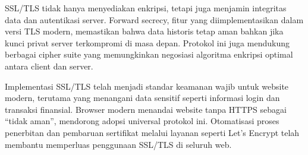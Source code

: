 \documentclass[a4paper,12pt]{report}
\begin{document}
SSL/TLS tidak hanya menyediakan enkripsi, tetapi juga menjamin integritas data dan autentikasi server. Forward secrecy, fitur yang diimplementasikan dalam versi TLS modern, memastikan bahwa data historis tetap aman bahkan jika kunci privat server terkompromi di masa depan. Protokol ini juga mendukung berbagai cipher suite yang memungkinkan negosiasi algoritma enkripsi optimal antara client dan server.

Implementasi SSL/TLS telah menjadi standar keamanan wajib untuk website modern, terutama yang menangani data sensitif seperti informasi login dan transaksi finansial. Browser modern menandai website tanpa HTTPS sebagai ``tidak aman'', mendorong adopsi universal protokol ini. Otomatisasi proses penerbitan dan pembaruan sertifikat melalui layanan seperti Let's Encrypt telah membantu memperluas penggunaan SSL/TLS di seluruh web.
\end{document}
